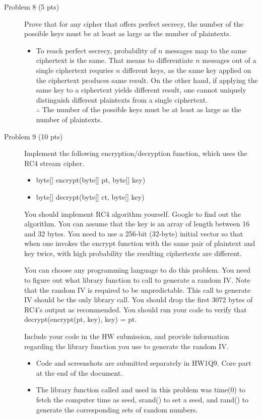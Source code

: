 \documentclass[11pt]{article}
\begin{document}
\begin{description}
 \item[Problem 8 (5 pts)]
Prove that for any cipher that offers perfect secrecy, the number of the possible keys must be at least as large as the number of plaintexts.\\
	\begin{itemize}
	\item
	To reach perfect secrecy, probability of $n$ messages map to the same ciphertext is the same. That means to differentiate $n$ messages out of a single ciphertext requries $n$ different keys, as the same key applied on the ciphertext produces same result. On the other hand, if applying the same key to a ciphertext yields different result, one cannot uniquely distinguish different plaintexts from a single ciphertext. \\
	$\therefore$ The number of the possible keys must be at least as large as the number of plaintexts.\\
	\end{itemize}
 \item[Problem 9 (10 pts)]
Implement the following encryption/decryption function, which uses the RC4 stream cipher.  
\begin{itemize} 
 \item
byte[] encrypt(byte[] pt, byte[] key)

 \item
byte[] decrypt(byte[] ct, byte[] key)
\end{itemize}

You should implement RC4 algorithm yourself.  Google to find out the algorithm.  You can assume that the key is an array of length between 16 and 32 bytes.  You need to use a 256-bit (32-byte) initial vector so that when one invokes the encrypt function with the same pair of plaintext and key twice, with high probability the resulting ciphertexts are different.

You can choose any programming language to do this problem.   You need to figure out what library function to call to generate a random IV.  Note that the random IV is required to be unpredictable.  This call to generate IV should be the only library call.  You should drop the first 3072 bytes of RC4's output as recommended.  You should run your code to verify that decrypt(encrypt(pt, key), key) = pt.

Include your code in the HW submission, and provide information regarding the library function you use to generate the random IV.
	\begin{itemize} 
	\item
	Code and screenshots are submitted separately in HW1Q9. Core part at the end of the document.
	\item The library function called and used in this problem was time(0) to fetch the computer time as seed, srand() to set a seed, and rand() to generate the corresponding sets of random numbers.
	\end{itemize}  

\end{description}
\end{document}
